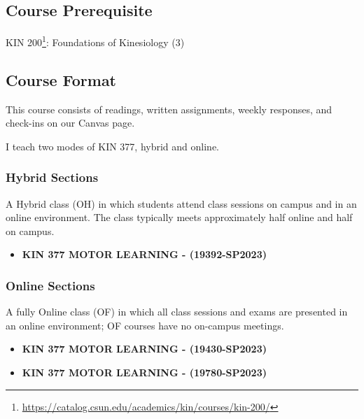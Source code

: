 \documentclass[
  letterpaper,
  DIV=11,
  numbers=noendperiod]{scrartcl}
\providecommand{\tightlist}{%
  \setlength{\itemsep}{0pt}\setlength{\parskip}{0pt}}\usepackage{longtable,booktabs,array}
\DeclareRobustCommand{\href}[2]{#2\footnote{\url{#1}}}
\begin{document}
\hypertarget{course-prerequisite}{%
\subsection{Course Prerequisite}\label{course-prerequisite}}

\href{https://catalog.csun.edu/academics/kin/courses/kin-200/}{KIN 200}:
Foundations of Kinesiology (3)

\hypertarget{course-format}{%
\subsection{Course Format}\label{course-format}}

This course consists of readings, written assignments, weekly responses,
and check-ins on our Canvas page.

I teach two modes of KIN 377, hybrid and online.

\hypertarget{hybrid-sections}{%
\subsubsection{Hybrid Sections}\label{hybrid-sections}}

A Hybrid class (OH) in which students attend class sessions on campus
and in an online environment. The class typically meets approximately
half online and half on campus.

\begin{itemize}
\tightlist
\item
  \textbf{KIN 377 MOTOR LEARNING - (19392-SP2023)}
\end{itemize}

\hypertarget{online-sections}{%
\subsubsection{Online Sections}\label{online-sections}}

A fully Online class (OF) in which all class sessions and exams are
presented in an online environment; OF courses have no on-campus
meetings.

\begin{itemize}
\item
  \textbf{KIN 377 MOTOR LEARNING - (19430-SP2023)}
\item
  \textbf{KIN 377 MOTOR LEARNING - (19780-SP2023)}
\end{itemize}
\end{document}
